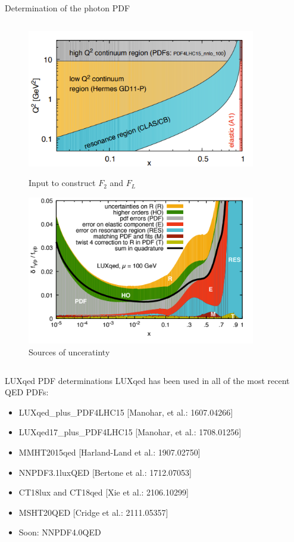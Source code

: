 \documentclass[aspectratio=169, 8pt,t]{beamer}
\begin{document}
\begin{frame}{Determination of the photon PDF}
\begin{columns}[T]
    \begin{column}{0.39\textwidth}
      \vspace*{-5em}
      \begin{figure}
        \includegraphics[width=0.89\textwidth]{figures/dataluxqed.png}
        \caption*{Input to construct $F_2$ and $F_L$}
        \includegraphics[width=0.89\textwidth]{figures/luxQED_uncs.png}
        \caption*{Sources of unceratinty}
      \end{figure}
    \end{column}
  \end{columns}
\end{frame}


\begin{frame}{LUXqed PDF determinations}
  LUXqed has been used in all of the most recent QED PDFs:
  \begin{itemize}
      \item LUXqed\_plus\_PDF4LHC15 {\color{gray}\small [Manohar, et al.: 1607.04266]}
      \item LUXqed17\_plus\_PDF4LHC15 {\color{gray}\small [Manohar, et al.: 1708.01256]}
      \item MMHT2015qed {\color{gray}\small [Harland-Land et al.: 1907.02750]}
      \item NNPDF3.1luxQED {\color{gray}\small [Bertone et al.: 1712.07053]}
      \item CT18lux and CT18qed {\color{gray}\small [Xie et al.: 2106.10299]}
      \item MSHT20QED {\color{gray}\small [Cridge et al.: 2111.05357]}
      \item Soon: NNPDF4.0QED
  \end{itemize}
\end{frame}
\end{document}
